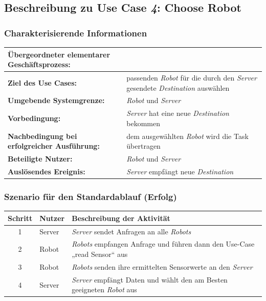 \documentclass[includeheaders]{scrartcl}
\begin{document}
		\subsection{Beschreibung zu Use Case \emph{4}: Choose Robot}

			\subsubsection*{Charakterisierende Informationen}

			\begin{table}[H]
				\centering
				\begin{tabularx}{\textwidth}{@{}p{5cm}X@{}}
				\toprule
				\textbf{Übergeordneter elementarer Geschäftsprozess:} & \\ \midrule
				\textbf{Ziel des Use Cases:} & passenden \emph{Robot} für die durch den \emph{Server} gesendete \emph{Destination} auswählen\\ \midrule
				\textbf{Umgebende Systemgrenze:} & \emph{Robot} und \emph{Server} \\ \midrule
				\textbf{Vorbedingung:} & \emph{Server} hat eine neue \emph{Destination} bekommen\\ \midrule
				\textbf{Nachbedingung bei erfolgreicher Ausführung:} & dem ausgewählten \emph{Robot} wird die Task übertragen\\ \midrule
				\textbf{Beteiligte Nutzer:} & \emph{Robot} und \emph{Server}\\ \midrule
				\textbf{Auslösendes Ereignis:} & \emph{Server} empfängt neue \emph{Destination}\\
				\bottomrule
				\end{tabularx}
			\end{table}

			\subsubsection*{Szenario für den Standardablauf (Erfolg)}

			\begin{table}[H]
				\centering
				\begin{tabularx}{\textwidth}{@{}cp{2cm}X@{}}
				\toprule
				Schritt & Nutzer & Beschreibung der Aktivität \\ \midrule
				1 & Server & \emph{Server} sendet Anfragen an alle \emph{Robots} \\
				2 & Robot & \emph{Robots} empfangen Anfrage und führen dann den Use-Case „read Sensor“ aus \\
				3 & Robot & \emph{Robots} senden ihre ermittelten Sensorwerte an den \emph{Server}\\
				4 & Server & \emph{Server} empfängt Daten und wählt den am Besten geeigneten \emph{Robot} aus \\
				\bottomrule
				\end{tabularx}
			\end{table}
\end{document}
